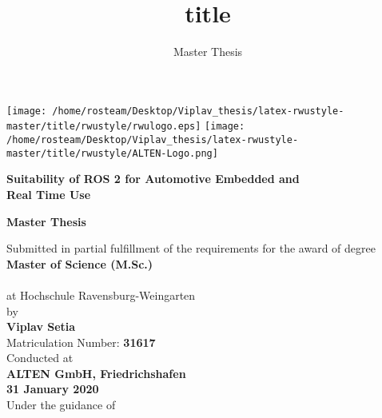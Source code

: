 \documentclass{scrartcl}
\title{title}
\subtitle{Master Thesis}
\begin{document}
\texttt{[image: /home/rosteam/Desktop/Viplav\_thesis/latex-rwustyle-master/title/rwustyle/rwulogo.eps]}
\hspace*{2cm}
\texttt{[image: /home/rosteam/Desktop/Viplav\_thesis/latex-rwustyle-master/title/rwustyle/ALTEN-Logo.png]}
\begin{center}
\vspace*{1.5cm}	{\color{rwuviolet}\huge\normalfont\bfseries Suitability of ROS 2 for Automotive Embedded and \\ \vspace*{2mm}Real Time Use}

\vspace*{4mm}	{\color{rwucyan}\Large\normalfont\bfseries Master Thesis}

\vspace*{4mm}	Submitted in partial fulfillment of the requirements for the award of degree\\
\vspace*{3mm} {\large\normalfont\bfseries Master of Science (M.Sc.)}\\
	  \vspace*{3mm}{ in \large\bfseries Mechatronics}	\\
	  \vspace*{3mm} at Hochschule Ravensburg-Weingarten\\
\vspace*{3mm}	by\\
	  \vspace*{2mm} {\large\normalfont\bfseries Viplav Setia}\\
	  \vspace*{2mm} {\large Matriculation Number: \bfseries 31617}\\
	  
	  \vspace*{4mm} {Conducted at}\\
	  \vspace*{3mm} {\large\normalfont\bfseries ALTEN GmbH, Friedrichshafen}\\
	  \vspace*{4mm}	{\large\normalfont\bfseries 31 January 2020}\\
	  \vspace*{5mm}	Under the guidance of\\
	  

\end{center}
\end{document}

